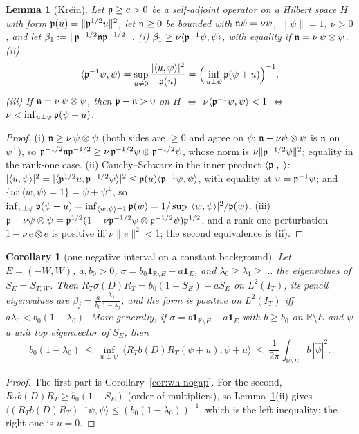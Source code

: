 \documentclass[11pt]{amsart}
\newtheorem{lemma}[theorem]{Lemma}
\newtheorem{corollary}[theorem]{Corollary}
\theoremstyle{definition}
\theoremstyle{remark}
\newcommand{\R}{\mathbb R}
\newcommand{\IT}{I_T}
\begin{document}
\begin{lemma}[Kre\u{\i}n]\label{lem:wh-krein}
Let $\mathfrak p\ge c>0$ be a self-adjoint operator on a Hilbert space $H$ with form $\mathfrak p(u)=\|\mathfrak p^{1/2}u\|^2$, let $\mathfrak n\ge0$ be
bounded with $\mathfrak n\psi=\nu\psi$, $\|\psi\|=1$, $\nu>0$, and let $\beta_1:=\|\mathfrak p^{-1/2}\mathfrak n\mathfrak p^{-1/2}\|$.
\emph{(i)} $\beta_1\ge\nu\langle\mathfrak p^{-1}\psi,\psi\rangle$, with equality if $\mathfrak n=\nu\,\psi\otimes\psi$.
\emph{(ii)}
\[
\langle\mathfrak p^{-1}\psi,\psi\rangle=\sup_{u\ne0}\frac{|\langle u,\psi\rangle|^2}{\mathfrak p(u)}=\Big(\inf_{u\perp\psi}\mathfrak p(\psi+u)\Big)^{-1}.
\]
\emph{(iii)} If $\mathfrak n=\nu\,\psi\otimes\psi$, then
$\mathfrak p-\mathfrak n>0$ on $H$ $\iff$ $\nu\langle\mathfrak p^{-1}\psi,\psi\rangle<1$ $\iff$ $\nu<\inf_{u\perp\psi}\mathfrak p(\psi+u)$.
\end{lemma}
\begin{proof}
(i) $\mathfrak n\ge\nu\,\psi\otimes\psi$ (both sides are $\ge0$ and agree on $\psi$; $\mathfrak n-\nu\psi\otimes\psi$ is $\mathfrak n$ on
$\psi^\perp$), so $\mathfrak p^{-1/2}\mathfrak n\mathfrak p^{-1/2}\ge\nu\,\mathfrak p^{-1/2}\psi\otimes\mathfrak p^{-1/2}\psi$, whose norm is $\nu\|\mathfrak p^{-1/2}\psi\|^2$;
equality in the rank-one case. (ii) Cauchy--Schwarz in the inner product $\langle\mathfrak p\cdot,\cdot\rangle$:
$|\langle u,\psi\rangle|^2=|\langle\mathfrak p^{1/2}u,\mathfrak p^{-1/2}\psi\rangle|^2\le\mathfrak p(u)\langle\mathfrak p^{-1}\psi,\psi\rangle$, with equality at
$u=\mathfrak p^{-1}\psi$; and $\{w:\langle w,\psi\rangle=1\}=\psi+\psi^\perp$, so $\inf_{u\perp\psi}\mathfrak p(\psi+u)=\inf_{\langle w,\psi\rangle=1}\mathfrak p(w)
=1/\sup|\langle w,\psi\rangle|^2/\mathfrak p(w)$. (iii) $\mathfrak p-\nu\psi\otimes\psi=\mathfrak p^{1/2}(1-\nu\mathfrak p^{-1/2}\psi\otimes\mathfrak p^{-1/2}\psi)\mathfrak p^{1/2}$,
and a rank-one perturbation $1-\nu\,e\otimes e$ is positive iff $\nu\|e\|^2<1$; the second equivalence is (ii).
\end{proof}

\begin{corollary}[one negative interval on a constant background]\label{cor:wh-step}
Let $E=(-W,W)$, $a,b_0>0$, $\sigma=b_0\mathbf 1_{\R\setminus E}-a\mathbf 1_E$, and $\lambda_0\ge\lambda_1\ge\dots$ the eigenvalues
of $S_E=S_{T,W}$. Then $R_T\sigma(D)R_T=b_0(1-S_E)-aS_E$ on $L^2(\IT)$, its pencil eigenvalues are
$\beta_j=\frac a{b_0}\frac{\lambda_j}{1-\lambda_j}$, and the form is positive on $L^2(\IT)$ iff $a\lambda_0<b_0(1-\lambda_0)$.
More generally, if $\sigma=b\mathbf 1_{\R\setminus E}-a\mathbf 1_E$ with $b\ge b_0$ on $\R\setminus E$ and $\psi$ a unit top eigenvector of $S_E$, then
\[
b_0(1-\lambda_0)\ \le\ \inf_{u\perp\psi}\ \langle R_Tb(D)R_T(\psi+u),\psi+u\rangle\ \le\ \frac1{2\pi}\int_{\R\setminus E}b\,|\widehat\psi|^2 .
\]
\end{corollary}
\begin{proof}
The first part is Corollary~\ref{cor:wh-nogap}. For the second, $R_Tb(D)R_T\ge b_0(1-S_E)$ (order of multipliers),
so Lemma~\ref{lem:wh-krein}(ii) gives $\langle(R_Tb(D)R_T)^{-1}\psi,\psi\rangle\le(b_0(1-\lambda_0))^{-1}$, which is the left
inequality; the right one is $u=0$.
\end{proof}
\end{document}
